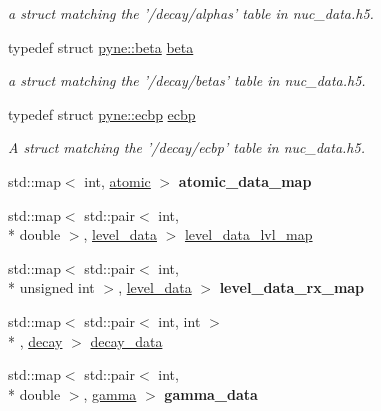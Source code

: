 \begin{DoxyCompactItemize}
\begin{DoxyCompactList}\small\item\em a struct matching the '/decay/alphas' table in nuc\+\_\+data.\+h5. \end{DoxyCompactList}\item 
\hypertarget{namespacepyne_ae80bdf847bfa789021a5dafc132772e1}{typedef struct \hyperlink{structpyne_1_1beta}{pyne\+::beta} \hyperlink{namespacepyne_ae80bdf847bfa789021a5dafc132772e1}{beta}}\label{namespacepyne_ae80bdf847bfa789021a5dafc132772e1}

\begin{DoxyCompactList}\small\item\em a struct matching the '/decay/betas' table in nuc\+\_\+data.\+h5. \end{DoxyCompactList}\item 
\hypertarget{namespacepyne_a172aa77622d272744ca413d8e1f89735}{typedef struct \hyperlink{structpyne_1_1ecbp}{pyne\+::ecbp} \hyperlink{namespacepyne_a172aa77622d272744ca413d8e1f89735}{ecbp}}\label{namespacepyne_a172aa77622d272744ca413d8e1f89735}

\begin{DoxyCompactList}\small\item\em A struct matching the '/decay/ecbp' table in nuc\+\_\+data.\+h5. \end{DoxyCompactList}\item 
\hypertarget{namespacepyne_ac53d31be0627daff52e6f9b4afc13ab5}{std\+::map$<$ int, \hyperlink{structpyne_1_1atomic}{atomic} $>$ {\bfseries atomic\+\_\+data\+\_\+map}}\label{namespacepyne_ac53d31be0627daff52e6f9b4afc13ab5}

\item 
std\+::map$<$ std\+::pair$<$ int, \\*
double $>$, \hyperlink{structpyne_1_1level__data}{level\+\_\+data} $>$ \hyperlink{namespacepyne_aa5b6136e3970959756640b867754bb62}{level\+\_\+data\+\_\+lvl\+\_\+map}
\item 
\hypertarget{namespacepyne_ae1858b7f76aa7faa5c758f6a42332202}{std\+::map$<$ std\+::pair$<$ int, \\*
unsigned int $>$, \hyperlink{structpyne_1_1level__data}{level\+\_\+data} $>$ {\bfseries level\+\_\+data\+\_\+rx\+\_\+map}}\label{namespacepyne_ae1858b7f76aa7faa5c758f6a42332202}

\item 
std\+::map$<$ std\+::pair$<$ int, int $>$\\*
, \hyperlink{structpyne_1_1decay}{decay} $>$ \hyperlink{namespacepyne_ac880c3701eca3453cb9cdfab30195d65}{decay\+\_\+data}
\item 
\hypertarget{namespacepyne_a590557e517e261616148c1643e72ddb2}{std\+::map$<$ std\+::pair$<$ int, \\*
double $>$, \hyperlink{structpyne_1_1gamma}{gamma} $>$ {\bfseries gamma\+\_\+data}}\label{namespacepyne_a590557e517e261616148c1643e72ddb2}


\end{DoxyCompactItemize}
